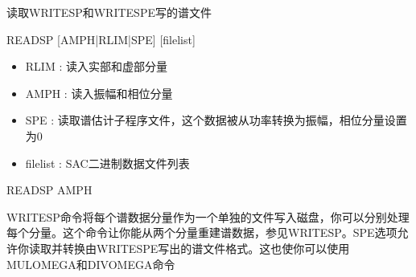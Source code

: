 \label{cmd:readsp}

读取WRITESP和WRITESPE写的谱文件

\begin{SACSTX}
READSP [AMPH|RLIM|SPE] [filelist]
\end{SACSTX}

\begin{itemize}
\item RLIM :  读入实部和虚部分量 
\item AMPH :  读入振幅和相位分量 
\item SPE : 读取谱估计子程序文件，这个数据被从功率转换为振幅，相位分量设置为0 
\item filelist : SAC二进制数据文件列表 
\end{itemize}

\begin{SACDFT}
READSP AMPH
\end{SACDFT}

WRITESP命令将每个谱数据分量作为一个单独的文件写入磁盘，你可以分别处理每个分量。这个命令让你能从两个分量重建谱数据，参见WRITESP。SPE选项允许你读取并转换由WRITESPE写出的谱文件格式。这也使你可以使用MULOMEGA和DIVOMEGA命令

